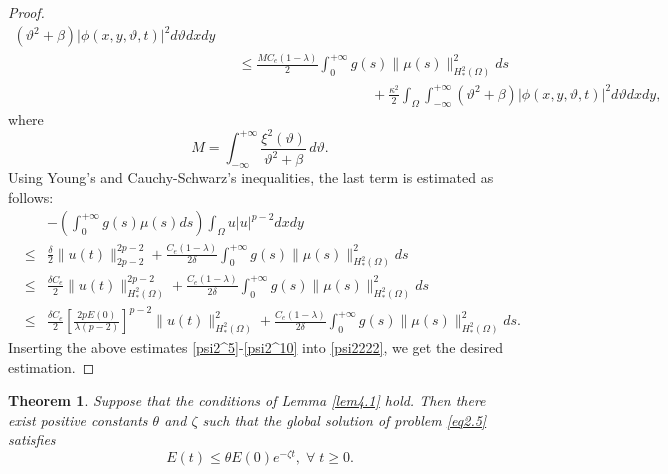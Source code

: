 \documentclass[12pt]{article}
\numberwithin{equation}{section}
\newtheorem{theorem}{Theorem}[section]
\begin{document}
\begin{proof}
\begin{eqnarray}
       (\vartheta^2+\beta)|\phi(x,y,\vartheta,t)|^2d\vartheta dx dy\nonumber\\
&&\le\frac{MC_e(1-\lambda)}{2}\int_{0}^{+\infty} g(s)
     \|\mu(s)\|_{H_*^{2}(\Omega)}^{2}ds\nonumber\\
&&\hspace{4cm}+\frac{\kappa^2}{2}\displaystyle\int_\Omega\int_{-\infty}^{+\infty}
       (\vartheta^2+\beta)|\phi(x,y,\vartheta,t)|^2d\vartheta dx dy,
\end{eqnarray}
where $$M=\int_{-\infty}^{+\infty}
       \frac{\xi^2(\vartheta)}{\vartheta^2+\beta}\,d\vartheta.$$
Using Young's and Cauchy-Schwarz's inequalities, the last term is estimated as follows:
\begin{eqnarray} \label{psi2^10}
&&-\left( \int_{0}^{+\infty} g(s)\mu(s)ds \right)\int_{\Omega} u|u|^{p-2}dx dy \nonumber\\
&\leq& \frac{\delta}{2}\|u(t)\|_{2p-2}^{2p-2}+\frac{C_e(1-\lambda)}{2\delta}\int_{0}^{+\infty} g(s)
     \|\mu(s)\|_{H_*^{2}(\Omega)}^{2}ds\nonumber\\
&\leq&\frac{\delta C_e}{2}\|u(t)\|_{H^2_*(\Omega)}^{2p-2}+\frac{C_e(1-\lambda)}{2\delta}\int_{0}^{+\infty} g(s)
     \|\mu(s)\|_{H_*^{2}(\Omega)}^{2}ds\nonumber\\
&\leq& \frac{\delta C_{e}}{2}\left[\frac{2 p E(0)}{\lambda(p-2) }\right]^{p-2}\|u(t)\|_{H^2_*(\Omega)}^{2}+\frac{C_e(1-\lambda)}{2\delta}\int_{0}^{+\infty} g(s)\|\mu(s)\|_{H_*^{2}(\Omega)}^{2}ds.
\end{eqnarray}
Inserting the above estimates \eqref{psi2^5}-\eqref{psi2^10} into \eqref{psi2222}, we get the desired estimation.
\end{proof}
\begin{theorem}
\label{thm5.5}
Suppose that the conditions of Lemma \ref{lem4.1} hold. Then there exist positive constants $\theta$ and $\zeta$ such that the global solution of problem \eqref{eq2.5} satisfies
\begin{equation}\label{equ5.14}
E(t) \leq \theta E(0) e^{- \zeta t},\;\forall\;t\geq0.
\end{equation}
\end{theorem}
\end{document}
